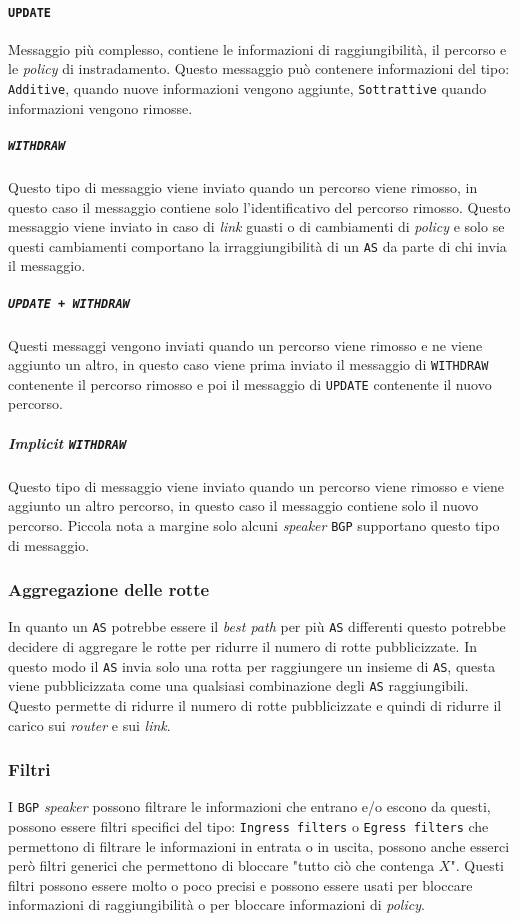             \paragraph{\texttt{UPDATE}} Messaggio più complesso, contiene le informazioni di raggiungibilità, il percorso e le \textit{policy} di instradamento. Questo messaggio può contenere informazioni del tipo: \texttt{Additive}, quando nuove informazioni vengono aggiunte, \texttt{Sottrattive} quando informazioni vengono rimosse.
                \subparagraph{\texttt{WITHDRAW}} Questo tipo di messaggio viene inviato quando un percorso viene rimosso, in questo caso il messaggio contiene solo l'identificativo del percorso rimosso. Questo messaggio viene inviato in caso di \textit{link} guasti o di cambiamenti di \textit{policy} e solo se questi cambiamenti comportano la irraggiungibilità di un \texttt{AS} da parte di chi invia il messaggio.
                \subparagraph{\texttt{UPDATE + WITHDRAW}} Questi messaggi vengono inviati quando un percorso viene rimosso e ne viene aggiunto un altro, in questo caso viene prima inviato il messaggio di \texttt{WITHDRAW} contenente il percorso rimosso e poi il messaggio di \texttt{UPDATE} contenente il nuovo percorso.
                \subparagraph{\textit{Implicit} \texttt{WITHDRAW}} Questo tipo di messaggio viene inviato quando un percorso viene rimosso e viene aggiunto un altro percorso, in questo caso il messaggio contiene solo il nuovo percorso. Piccola nota a margine solo alcuni \textit{speaker} \texttt{BGP} supportano questo tipo di messaggio.
        \subsubsection{Aggregazione delle rotte}
            In quanto un \texttt{AS} potrebbe essere il \textit{best path} per più \texttt{AS} differenti questo potrebbe decidere di aggregare le rotte per ridurre il numero di rotte pubblicizzate. In questo modo il \texttt{AS} invia solo una rotta per raggiungere un insieme di \texttt{AS}, questa viene pubblicizzata come una qualsiasi combinazione degli \texttt{AS} raggiungibili. Questo permette di ridurre il numero di rotte pubblicizzate e quindi di ridurre il carico sui \textit{router} e sui \textit{link}.
        \subsubsection{Filtri}
            I \texttt{BGP} \textit{speaker} possono filtrare le informazioni che entrano e/o escono da questi, possono essere filtri specifici del tipo: \texttt{Ingress filters} o \texttt{Egress filters} che permettono di filtrare le informazioni in entrata o in uscita, possono anche esserci però filtri generici che permettono di bloccare "tutto ciò che contenga $X$". Questi filtri possono essere molto o poco precisi e possono essere usati per bloccare informazioni di raggiungibilità o per bloccare informazioni di \textit{policy}.
